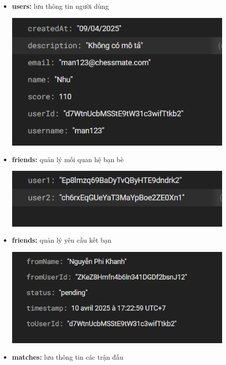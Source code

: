 \documentclass[a4paper,12pt]{article}
\begin{document}
\begin{itemize}[label=·]
    \item \textbf{users:} lưu thông tin người dùng
          \begin{center}
              \includegraphics[width=0.9\textwidth]{img/user.png}
          \end{center}
    \item \textbf{friends:} quản lý mối quan hệ bạn bè
          \begin{center}
              \includegraphics[width=0.9\textwidth]{img/friend.png}
          \end{center}
     \item \textbf{friends:} quản lý yêu cầu kết bạn
          \begin{center}
              \includegraphics[width=0.9\textwidth]{img/friend_request.png}
          \end{center}
    \item \textbf{matches:} lưu thông tin các trận đấu

\end{itemize}
\end{document}
